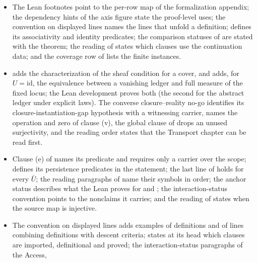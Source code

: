 \begin{itemize}
  for the retained saturation \(\operatorname{Sat}_5\) itself, for a
  reduct-stable predicate; 
  states its factorization form and the product corollary; and the Lean
  development proves these and the empty-moduli clause of . The
  reading of  states what the recorded flag affects, the
  correlation predicate of  is described as defined from the
  data, and one instantiation of the Self-Reference and Limits chapter is
  relabelled an analogy.
\item The Lean footnotes point to the per-row map of the formalization
  appendix; the dependency hints of the axis figure state the proof-level uses;
  the convention on displayed lines names the lines that unfold a definition;
   defines its associativity and identity predicates; the
  comparison statuses of  are stated with the theorem; the
  reading of  states which clauses use the continuation data; and
  the coverage row of  lists the finite instances.
\item {} adds the characterization of the sheaf condition for a
  cover, and  adds, for \(U=\mathrm{id}\), the equivalence between
  a vanishing ledger and full measure of the fixed locus; the Lean development
  proves both (the second for the abstract ledger under explicit laws). The
  converse closure--reality no-go identifies its closure-instantiation-gap
  hypothesis with a witnessing carrier,  names the operation and zero of clause (v),
  the global clause of  drops an unused surjectivity, and the
  reading order states that the Transport chapter can be read first.
\item Clause (e) of  names its predicate and requires only a
  carrier over the scope;  defines its persistence predicates in
  the statement; the last line of  holds for every \(\bar U\); the
  reading paragraphs of  name their symbols in order;
  the anchor status describes what the Lean proves for  and
  ; the interaction-status convention points to the nonclaims it
  carries; and the reading of  states when the source map is
  injective.
\item The convention on displayed lines adds examples of definitions and of
  lines combining definitions with descent criteria;  states at its head which clauses are imported,
  definitional and proved; the interaction-status paragraphs of the Access,

\end{itemize}
